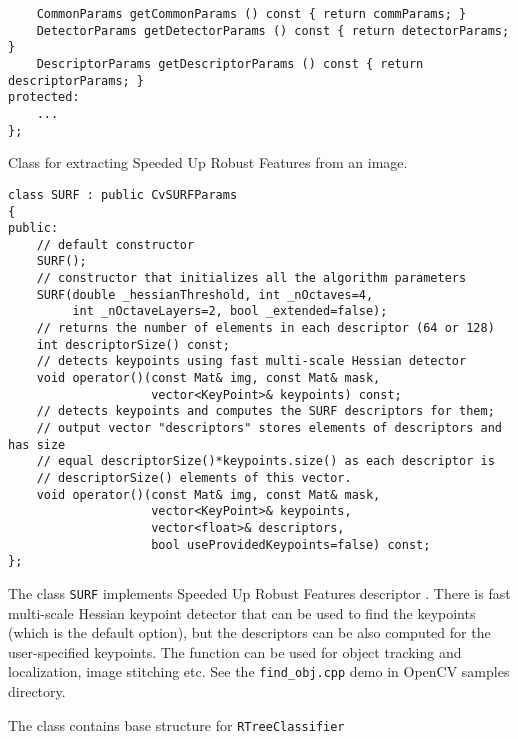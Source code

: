 \begin{lstlisting}
    CommonParams getCommonParams () const { return commParams; }
    DetectorParams getDetectorParams () const { return detectorParams; }
    DescriptorParams getDescriptorParams () const { return descriptorParams; }
protected:
    ...
};
\end{lstlisting}

Class for extracting Speeded Up Robust Features from an image.

\begin{lstlisting}
class SURF : public CvSURFParams
{
public:
    // default constructor
    SURF();
    // constructor that initializes all the algorithm parameters
    SURF(double _hessianThreshold, int _nOctaves=4,
         int _nOctaveLayers=2, bool _extended=false);
    // returns the number of elements in each descriptor (64 or 128)
    int descriptorSize() const;
    // detects keypoints using fast multi-scale Hessian detector
    void operator()(const Mat& img, const Mat& mask,
                    vector<KeyPoint>& keypoints) const;
    // detects keypoints and computes the SURF descriptors for them;
    // output vector "descriptors" stores elements of descriptors and has size 
    // equal descriptorSize()*keypoints.size() as each descriptor is 
    // descriptorSize() elements of this vector.
    void operator()(const Mat& img, const Mat& mask,
                    vector<KeyPoint>& keypoints,
                    vector<float>& descriptors,
                    bool useProvidedKeypoints=false) const;
};
\end{lstlisting}

The class \texttt{SURF} implements Speeded Up Robust Features descriptor \cite{Bay06}.
There is fast multi-scale Hessian keypoint detector that can be used to find the keypoints
(which is the default option), but the descriptors can be also computed for the user-specified keypoints.
The function can be used for object tracking and localization, image stitching etc. See the
\texttt{find\_obj.cpp} demo in OpenCV samples directory.

The class contains base structure for \texttt{RTreeClassifier}

